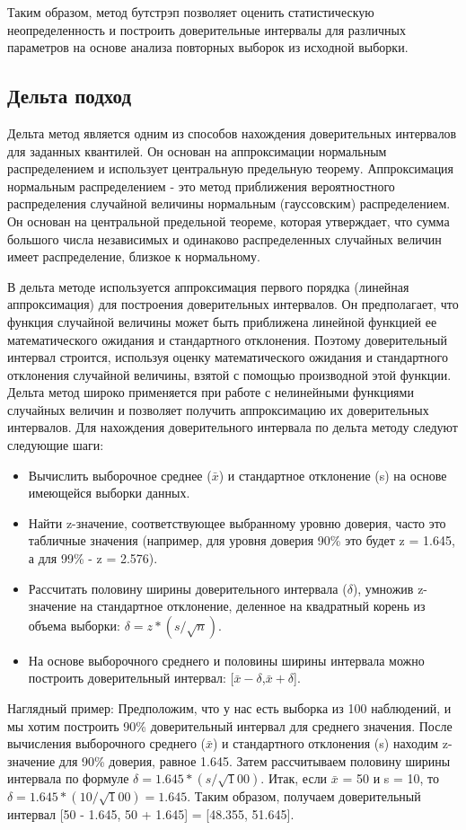 \documentclass[specialist,
               substylefile = spbu_report.rtx,
               subf,href,colorlinks=true, 12pt]{disser}
\begin{document}
Таким образом, метод бутстрэп позволяет оценить статистическую неопределенность и построить доверительные интервалы для различных параметров на основе анализа повторных выборок из исходной выборки.

\subsection{Дельта подход}

Дельта метод является одним из способов нахождения доверительных интервалов для заданных квантилей. Он основан на аппроксимации нормальным распределением 
и использует центральную предельную теорему. Аппроксимация нормальным распределением - это метод приближения вероятностного распределения случайной величины нормальным (гауссовским) распределением. Он основан на центральной предельной теореме, которая утверждает, что сумма большого числа независимых и одинаково распределенных случайных величин имеет распределение, близкое к нормальному.

В дельта методе используется аппроксимация первого порядка (линейная аппроксимация) для построения доверительных интервалов. Он предполагает, что функция случайной величины может быть приближена линейной функцией ее математического ожидания и стандартного отклонения. Поэтому доверительный интервал строится, используя оценку математического ожидания и стандартного отклонения случайной величины, взятой с помощью производной этой функции. Дельта метод широко применяется при работе с нелинейными функциями случайных величин и позволяет получить аппроксимацию их доверительных интервалов.
\newline
Для нахождения доверительного интервала по дельта методу следуют следующие шаги:
\begin{itemize}
    \item Вычислить выборочное среднее ($\bar x$) и стандартное отклонение (s) на основе имеющейся выборки данных.
    \item Найти z-значение, соответствующее выбранному уровню доверия, часто это табличные значения (например, для уровня доверия 90\% это будет z = 1.645, а для 99\% - z = 2.576).
    \item Рассчитать половину ширины доверительного интервала ($\delta$), умножив z-значение на стандартное отклонение, деленное на квадратный корень из объема выборки: $\delta = z * (s / \sqrt n)$.
    \item На основе выборочного среднего и половины ширины интервала можно построить доверительный интервал: [$ \bar x - \delta$,$ \bar x  + \delta$].
\end{itemize}
Наглядный пример: 
\newline
Предположим, что у нас есть выборка из 100 наблюдений, и мы хотим построить 90\% доверительный интервал для среднего значения. После вычисления выборочного среднего ($\bar x$) и стандартного отклонения (s) находим z-значение для 90\% доверия, равное 1.645. Затем рассчитываем половину ширины интервала по формуле $\delta = 1.645 * (s / \sqrt 100)$. Итак, если $\bar x$ = 50 и s = 10, то $\delta = 1.645 * (10 / \sqrt 100) = 1.645$. Таким образом, получаем доверительный интервал [50 - 1.645, 50 + 1.645] = [48.355, 51.645].
\end{document}
